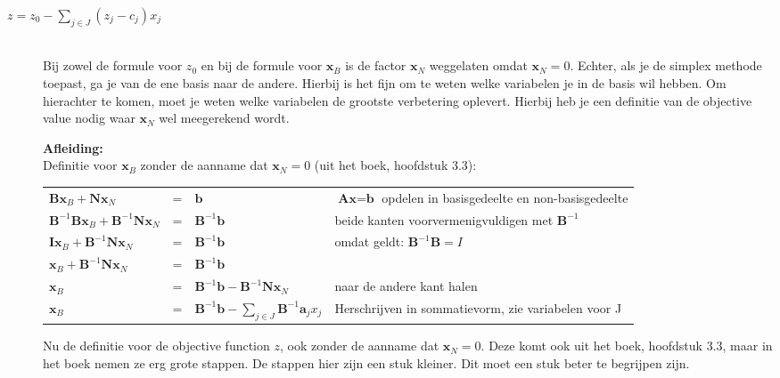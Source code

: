 \documentclass[10pt,a4paper]{article}
\begin{document}
\begin{description}
\item[$z = z_0 - \displaystyle\sum\limits_{j \in J} (z_j - c_j)x_j $] \hfill \\
Bij zowel de formule voor $z_0$ en bij de formule voor $\textbf{x}_B$ is de factor $\textbf{x}_N$ weggelaten omdat $\textbf{x}_N = 0$. Echter, als je de simplex methode toepast, ga je van de ene basis naar de andere. Hierbij is het fijn om te weten welke variabelen je in de basis wil hebben. Om hierachter te komen, moet je weten welke variabelen de grootste verbetering oplevert. Hierbij heb je een definitie van de objective value nodig waar $\textbf{x}_N$ wel meegerekend wordt.

\textbf{Afleiding:} \\
Definitie voor $\textbf{x}_B$ zonder de aanname dat $\textbf{x}_N = 0$ (uit het boek, hoofdstuk 3.3):

\begin{tabular}{l l l l}
$\textbf{Bx}_B + \textbf{Nx}_N$ & = & $\textbf{b}$ & $\textbf{Ax} = \textbf{b}$ opdelen in basisgedeelte en non-basisgedeelte \\
$\textbf{B}^ {-1}\textbf{Bx}_B + \textbf{B}^ {-1}\textbf{Nx}_N$ & = & $\textbf{B}^ {-1}\textbf{b}$ & beide kanten voorvermenigvuldigen met $\textbf{B}^{-1}$ \\
$\textbf{Ix}_B + \textbf{B}^ {-1}\textbf{Nx}_N$ & = & $\textbf{B}^ {-1}\textbf{b}$ & omdat geldt: $\textbf{B}^{-1}\textbf{B} = I$ \\
$\textbf{x}_B + \textbf{B}^ {-1}\textbf{Nx}_N$ & = & $\textbf{B}^ {-1}\textbf{b}$ & \\
$\textbf{x}_B$ & = & $\textbf{B}^{-1}\textbf{b} - \textbf{B}^ {-1}\textbf{Nx}_N$ & naar de andere kant halen \\
$\textbf{x}_B$ & = & $\textbf{B}^{-1}\textbf{b} - \displaystyle\sum\limits_{j \in J}\textbf{B}^ {-1}\textbf{a}_j x_j$ & Herschrijven in sommatievorm, zie variabelen voor J \\
\end{tabular}

Nu de definitie voor de objective function $z$, ook zonder de aanname dat $\textbf{x}_N = 0$. Deze komt ook uit het boek, hoofdstuk 3.3, maar in het boek nemen ze erg grote stappen. De stappen hier zijn een stuk kleiner. Dit moet een stuk beter te begrijpen zijn.


\end{description}
\end{document}

